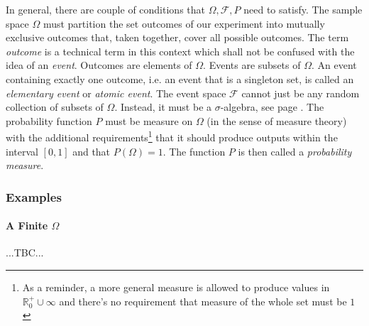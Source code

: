\medskip
In general, there are couple of conditions that $\Omega, \mathcal{F}, P$ need to satisfy. The sample space $\Omega$ must partition the set outcomes of our experiment into mutually exclusive outcomes that, taken together, cover all possible outcomes. The term \emph{outcome} is a technical term in this context which shall not be confused with the idea of an \emph{event}. Outcomes are elements of $\Omega$. Events are subsets of $\Omega$. An event containing exactly one outcome, i.e. an event that is a singleton set, is called an \emph{elementary event} or \emph{atomic event}. The event space $\mathcal{F}$ cannot just be any random collection of subsets of $\Omega$. Instead, it must be a $\sigma$-algebra, see page \pageref{Def:SigmaAlgebra}. The probability function $P$ must be measure on $\Omega$ (in the sense of measure theory) with the additional requirements\footnote{As a reminder, a more general measure is allowed to produce values in $\mathbb{R}^+_0 \cup \infty$ and there's no requirement that measure of the whole set must be $1$} that it should produce outputs within the interval $[0,1]$ and that $P(\Omega) = 1$. The function $P$ is then called a \emph{probability measure}.








\subsubsection{Examples}

\paragraph{A Finite $\Omega$} ...TBC...

